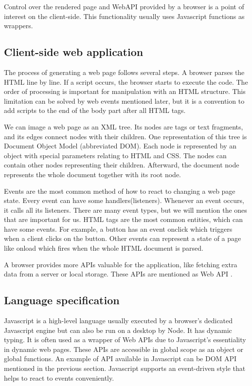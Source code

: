 Control over the rendered page and WebAPI provided by a browser is a point of interest on the client-side.
This functionality usually uses Javascript functions as wrappers. 

\subsection{Client-side web application}

The process of generating a web page follows several steps.
A browser parses the HTML line by line. If a script occurs, the browser starts to execute the code.
The order of processing is important for manipulation with an HTML structure.
This limitation can be solved by web events mentioned later, but
it is a convention to add scripts to the end of the body part after all HTML tags.

We can image a web page as an XML tree.
Its nodes are tags or text fragments, and its edges connect nodes with their children.
One representation of this tree is Document Object Model (abbreviated DOM).
Each node is represented by an object with special parameters relating to HTML and CSS. 
The nodes can contain other nodes representing their children.
Afterward, the document node represents the whole document together with its root node.

Events are the most common method of how to react to changing a web page state.
Every event can have some handlers(listeners).
Whenever an event occurs, it calls all its listeners.
There are many event types, but we will mention the ones that are important for us.
HTML tags are the most common entities, which can have some events.
For example, a button has an event onclick which triggers when a client clicks on the button. 
Other events can represent a state of a page like onload which fires when the whole HTML document is parsed.

A browser provides more APIs valuable for the application, like fetching extra data from a server or local storage.
These APIs are mentioned as Web API .

\subsection{Language specification}

Javascript is a high-level language usually executed by a browser's dedicated Javascript engine but can also be run on a desktop by Node.
It has dynamic typing.
It is often used as a wrapper of Web APIs due to Javascript's essentiality in dynamic web pages.
These APIs are accessible in global scope as an object or global functions.
An example of API available in Javascript can be DOM API mentioned in the previous section.
Javascript supports an event-driven style that helps to react to events conveniently.

